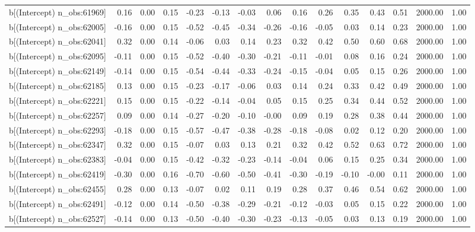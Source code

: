 \begin{table}[ht]
\begin{tabular}{rrrrrrrrrrrrrrr}
  b[(Intercept) n\_obs:61969] & 0.16 & 0.00 & 0.15 & -0.23 & -0.13 & -0.03 & 0.06 & 0.16 & 0.26 & 0.35 & 0.43 & 0.51 & 2000.00 & 1.00 \\ 
  b[(Intercept) n\_obs:62005] & -0.16 & 0.00 & 0.15 & -0.52 & -0.45 & -0.34 & -0.26 & -0.16 & -0.05 & 0.03 & 0.14 & 0.23 & 2000.00 & 1.00 \\ 
  b[(Intercept) n\_obs:62041] & 0.32 & 0.00 & 0.14 & -0.06 & 0.03 & 0.14 & 0.23 & 0.32 & 0.42 & 0.50 & 0.60 & 0.68 & 2000.00 & 1.00 \\ 
  b[(Intercept) n\_obs:62095] & -0.11 & 0.00 & 0.15 & -0.52 & -0.40 & -0.30 & -0.21 & -0.11 & -0.01 & 0.08 & 0.16 & 0.24 & 2000.00 & 1.00 \\ 
  b[(Intercept) n\_obs:62149] & -0.14 & 0.00 & 0.15 & -0.54 & -0.44 & -0.33 & -0.24 & -0.15 & -0.04 & 0.05 & 0.15 & 0.26 & 2000.00 & 1.00 \\ 
  b[(Intercept) n\_obs:62185] & 0.13 & 0.00 & 0.15 & -0.23 & -0.17 & -0.06 & 0.03 & 0.14 & 0.24 & 0.33 & 0.42 & 0.49 & 2000.00 & 1.00 \\ 
  b[(Intercept) n\_obs:62221] & 0.15 & 0.00 & 0.15 & -0.22 & -0.14 & -0.04 & 0.05 & 0.15 & 0.25 & 0.34 & 0.44 & 0.52 & 2000.00 & 1.00 \\ 
  b[(Intercept) n\_obs:62257] & 0.09 & 0.00 & 0.14 & -0.27 & -0.20 & -0.10 & -0.00 & 0.09 & 0.19 & 0.28 & 0.38 & 0.44 & 2000.00 & 1.00 \\ 
  b[(Intercept) n\_obs:62293] & -0.18 & 0.00 & 0.15 & -0.57 & -0.47 & -0.38 & -0.28 & -0.18 & -0.08 & 0.02 & 0.12 & 0.20 & 2000.00 & 1.00 \\ 
  b[(Intercept) n\_obs:62347] & 0.32 & 0.00 & 0.15 & -0.07 & 0.03 & 0.13 & 0.21 & 0.32 & 0.42 & 0.52 & 0.63 & 0.72 & 2000.00 & 1.00 \\ 
  b[(Intercept) n\_obs:62383] & -0.04 & 0.00 & 0.15 & -0.42 & -0.32 & -0.23 & -0.14 & -0.04 & 0.06 & 0.15 & 0.25 & 0.34 & 2000.00 & 1.00 \\ 
  b[(Intercept) n\_obs:62419] & -0.30 & 0.00 & 0.16 & -0.70 & -0.60 & -0.50 & -0.41 & -0.30 & -0.19 & -0.10 & -0.00 & 0.11 & 2000.00 & 1.00 \\ 
  b[(Intercept) n\_obs:62455] & 0.28 & 0.00 & 0.13 & -0.07 & 0.02 & 0.11 & 0.19 & 0.28 & 0.37 & 0.46 & 0.54 & 0.62 & 2000.00 & 1.00 \\ 
  b[(Intercept) n\_obs:62491] & -0.12 & 0.00 & 0.14 & -0.50 & -0.38 & -0.29 & -0.21 & -0.12 & -0.03 & 0.05 & 0.15 & 0.22 & 2000.00 & 1.00 \\ 
  b[(Intercept) n\_obs:62527] & -0.14 & 0.00 & 0.13 & -0.50 & -0.40 & -0.30 & -0.23 & -0.13 & -0.05 & 0.03 & 0.13 & 0.19 & 2000.00 & 1.00 \\ 

\end{tabular}
\end{table}
